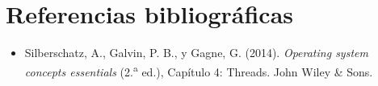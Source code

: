 \documentclass[12pt,letterpaper]{article}
\begin{document}
\section*{Referencias bibliográficas}

\begin{itemize}[leftmargin=1.5em,itemsep=6pt]

\item[] Silberschatz, A., Galvin, P. B., y Gagne, G. (2014). \textit{Operating system concepts essentials} (2.\textsuperscript{a} ed.), Capítulo 4: Threads. John Wiley \& Sons.

\end{itemize}
\end{document}
